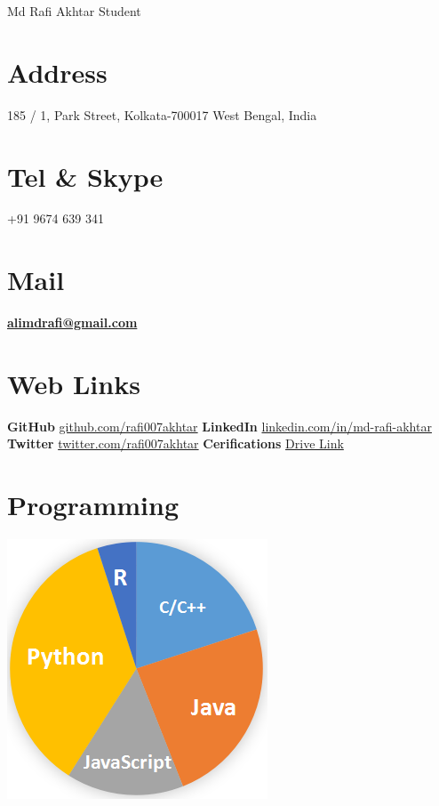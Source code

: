 \documentclass[]{friggeri-cv}
\begin{document}
\header{} {Md Rafi Akhtar}
      {Student}
      

\begin{aside}
  \section{Address}
    185 / 1, Park Street, Kolkata-700017
    West Bengal, India
    ~
  \section{Tel \& Skype}
    +91 9674 639 341
    ~
  \section{Mail}
    \href{mailto:alimdrafi.com}{\textbf{alimdrafi@gmail.com}}
    ~
  \section{Web Links}
    \textbf{GitHub} \href{https://github.com/rafi007akhtar}{github.com/rafi007akhtar}
    \textbf{LinkedIn} \href{https://www.linkedin.com/in/md-rafi-akhtar}{linkedin.com/in/md-rafi-akhtar}
    \textbf{Twitter} \href{https://twitter.com/rafi007akhtar}{twitter.com/rafi007akhtar}
    \textbf{Cerifications}
    \href{https://drive.google.com/open?id=1yXkhjvAwEwfuUrkH_Ks33mNrBGWDfhWL}{Drive Link}
    ~
  \section{Programming}
    \includegraphics[scale=0.5]{img/languages.png}
    ~

\end{aside}
\end{document}
